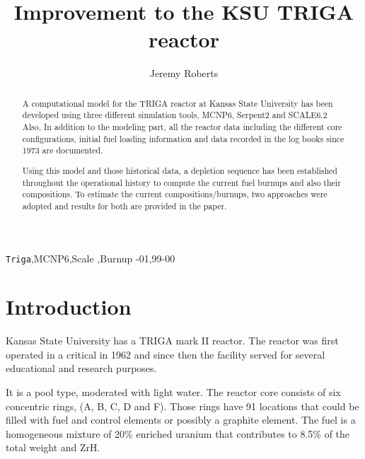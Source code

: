 \documentclass[review]{elsarticle}
\begin{document}
\begin{frontmatter}

\title{Improvement to the KSU TRIGA reactor}

\author{Jeremy Roberts}
\address{Department of Mechanical and Nuclear Engineering, Kansas State University, Manhattan, KS 66506, USA}



\begin{abstract}
A computational model for the TRIGA reactor at Kansas State University has been developed using three 
different simulation tools, MCNP6, Serpent2 and SCALE6.2
Also, In addition to the modeling part, all the reactor data including the different core configurations, initial fuel loading information and data recorded in the log books since 1973 are documented.

Using this model and those historical data, a depletion sequence has been established throughout the 
operational history to compute the current fuel burnups and also their compositions.
To estimate the current compositions/burnups, two approaches were adopted and results for both are provided in the paper.


\end{abstract}

\begin{keyword}
\texttt{Triga}\sep MCNP6\sep Scale \sep Burnup
-01\sep  99-00
\end{keyword}

\end{frontmatter}

\linenumbers

\section{Introduction}
Kansas State University has a TRIGA mark II reactor. The reactor was first operated in  a critical in 1962 and since then the facility served for several educational and research purposes.

It is a pool type, moderated with light water. The reactor core consists of six concentric rings, (A, B, C, D and F). Those rings have 91 locations that could be filled with fuel and control elements or possibly a graphite element.
The fuel is a homogeneous mixture of 20\% enriched uranium that contributes to 8.5\% of the total weight and ZrH.
\end{document}

